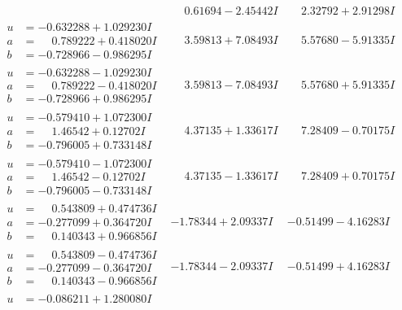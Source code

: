\documentclass[1p]{elsarticle_modified}
\theoremstyle{definition}
\begin{document}
$$\begin{array}{c|c|c}
 & \phantom{-}0.61694 - 2.45442 I & \phantom{-}2.32792 + 2.91298 I \\ \hline\begin{aligned}
u &= -0.632288 + 1.029230 I \\
a &= \phantom{-}0.789222 + 0.418020 I \\
b &= -0.728966 - 0.986295 I\end{aligned}
 & \phantom{-}3.59813 + 7.08493 I & \phantom{-}5.57680 - 5.91335 I \\ \hline\begin{aligned}
u &= -0.632288 - 1.029230 I \\
a &= \phantom{-}0.789222 - 0.418020 I \\
b &= -0.728966 + 0.986295 I\end{aligned}
 & \phantom{-}3.59813 - 7.08493 I & \phantom{-}5.57680 + 5.91335 I \\ \hline\begin{aligned}
u &= -0.579410 + 1.072300 I \\
a &= \phantom{-}1.46542 + 0.12702 I \\
b &= -0.796005 + 0.733148 I\end{aligned}
 & \phantom{-}4.37135 + 1.33617 I & \phantom{-}7.28409 - 0.70175 I \\ \hline\begin{aligned}
u &= -0.579410 - 1.072300 I \\
a &= \phantom{-}1.46542 - 0.12702 I \\
b &= -0.796005 - 0.733148 I\end{aligned}
 & \phantom{-}4.37135 - 1.33617 I & \phantom{-}7.28409 + 0.70175 I \\ \hline\begin{aligned}
u &= \phantom{-}0.543809 + 0.474736 I \\
a &= -0.277099 + 0.364720 I \\
b &= \phantom{-}0.140343 + 0.966856 I\end{aligned}
 & -1.78344 + 2.09337 I & -0.51499 - 4.16283 I \\ \hline\begin{aligned}
u &= \phantom{-}0.543809 - 0.474736 I \\
a &= -0.277099 - 0.364720 I \\
b &= \phantom{-}0.140343 - 0.966856 I\end{aligned}
 & -1.78344 - 2.09337 I & -0.51499 + 4.16283 I \\ \hline\begin{aligned}
u &= -0.086211 + 1.280080 I \\

\end{aligned}
\end{array}$$
\end{document}
